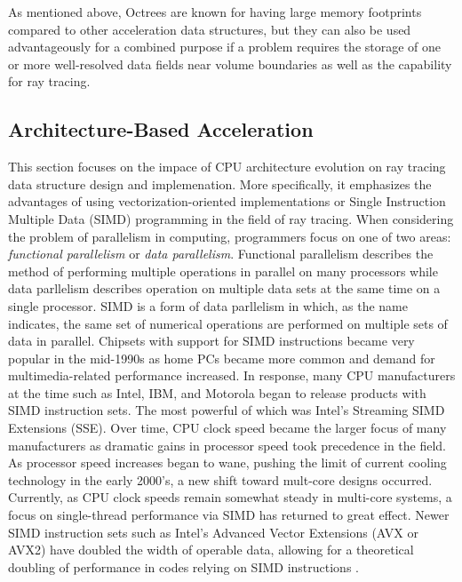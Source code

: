 As mentioned above, Octrees are known for having large memory footprints
compared to other acceleration data structures, but they can also be used
advantageously for a combined purpose if a problem requires the storage of one
or more well-resolved data fields near volume boundaries as well as the
capability for ray tracing.

\subsection{Architecture-Based Acceleration}%
\label{subsec:arch}


This section focuses on the impace of CPU architecture evolution on ray tracing
data structure design and implemenation. More specifically, it emphasizes the
advantages of using vectorization-oriented implementations or Single Instruction
Multiple Data (SIMD) programming in the field of ray tracing. When considering
the problem of parallelism in computing, programmers focus on one of two areas:
\textit{functional parallelism} or \textit{data parallelism}. Functional
parallelism describes the method of performing multiple operations in parallel
on many processors while data parllelism describes operation on multiple data
sets at the same time on a single processor. SIMD is a form of data parllelism
in which, as the name indicates, the same set of numerical operations are
performed on multiple sets of data in parallel. Chipsets with support for SIMD
instructions became very popular in the mid-1990s as home PCs became more common
and demand for multimedia-related performance increased. In response, many CPU
manufacturers at the time such as Intel, IBM, and Motorola began to release
products with SIMD instruction sets. The most powerful of which was Intel's
Streaming SIMD Extensions (SSE). Over time, CPU clock speed became the larger
focus of many manufacturers as dramatic gains in processor speed took
precedence in the field. As processor speed increases began to wane, pushing the
limit of current cooling technology in the early 2000's, a new shift toward
mult-core designs occurred. Currently, as CPU clock speeds remain somewhat
steady in multi-core systems, a focus on single-thread performance via SIMD has
returned to great effect. Newer SIMD instruction sets such as Intel's Advanced
Vector Extensions (AVX or AVX2) have doubled the width of
operable data, allowing for a theoretical doubling of performance in codes
relying on SIMD instructions \cite{Hughes_2015}.

